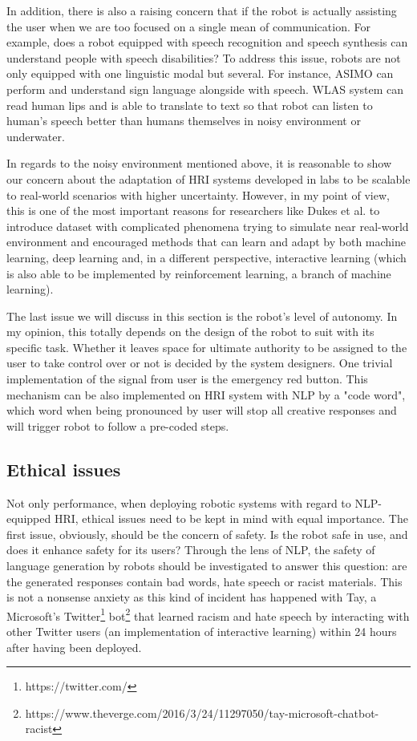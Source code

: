 \documentclass[10pt, a4paper]{article}
\begin{document}
In addition, there is also a raising concern that if the robot is actually assisting the user when we are too focused on a single mean of communication. For example, does a robot equipped with speech recognition and speech synthesis can understand people with speech disabilities? To address this issue, robots are not only equipped with one linguistic modal but several. For instance, ASIMO can perform and understand sign language alongside with speech. WLAS system \cite{azaria2016instructable} can read human lips and is able to translate to text so that robot can listen to human's speech better than humans themselves in noisy environment or underwater.

In regards to the noisy environment mentioned above, it is reasonable to show our concern about the adaptation of HRI systems developed in labs to be scalable to real-world scenarios with higher uncertainty. However, in my point of view, this is one of the most important reasons for researchers like Dukes et al. to introduce dataset with complicated phenomena trying to simulate near real-world environment and encouraged methods that can learn and adapt by both machine learning, deep learning and, in a different perspective, interactive learning (which is also able to be implemented by reinforcement learning, a branch of machine learning).

The last issue we will discuss in this section is the robot's level of autonomy. In my opinion, this totally depends on the design of the robot to suit with its specific task. Whether it leaves space for ultimate authority to be assigned to the user to take control over or not is decided by the system designers. One trivial implementation of the signal from user is the emergency red button. This mechanism can be also implemented on HRI system with NLP by a "code word", which word when being pronounced by user will stop all creative responses and will trigger robot to follow a pre-coded steps.

\subsection{Ethical issues}
Not only performance, when deploying robotic systems with regard to NLP-equipped HRI, ethical issues need to be kept in mind with equal importance. The first issue, obviously, should be the concern of safety. Is the robot safe in use, and does it enhance safety for its users? Through the lens of NLP, the safety of language generation by robots should be investigated to answer this question: are the generated responses contain bad words, hate speech or racist materials. This is not a nonsense anxiety as this kind of incident has happened with Tay, a Microsoft's Twitter\footnote{https://twitter.com/} bot\footnote{https://www.theverge.com/2016/3/24/11297050/tay-microsoft-chatbot-racist} that learned racism and hate speech by interacting with other Twitter users (an implementation of interactive learning) within 24 hours after having been deployed.
\end{document}
